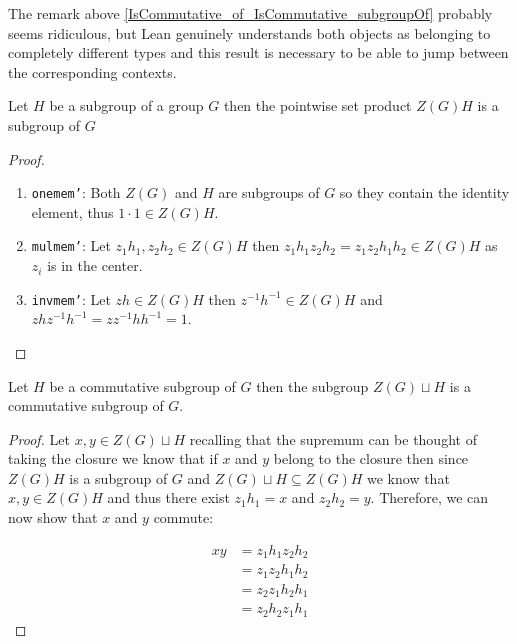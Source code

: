 \begin{remark}
  The remark above \ref{IsCommutative_of_IsCommutative_subgroupOf} probably seems ridiculous, but Lean genuinely understands both objects as belonging to completely different types and 
  this result is necessary to be able to jump between the corresponding contexts.
\end{remark}

\begin{definition}
  \label{center_mul}
  \leanok
  Let $H$ be a subgroup of a group $G$ then the pointwise set product $Z(G) H$ is a subgroup of $G$
\end{definition}
\begin{proof}
\begin{enumerate}
  \item \texttt{one\textunderscore mem'}: Both $Z(G)$ and $H$ are subgroups of $G$ so they contain the identity element, thus $1 \cdot 1 \in Z(G) H$.
  \item \texttt{mul\textunderscore mem'}: Let $z_1 h_1, z_2 h_2 \in Z(G) H$ then $z_1h_1z_2h_2 = z_1z_2 h_1h_2 \in Z(G) H$ as $z_i$ is in the center.
  \item \texttt{inv\textunderscore mem'}: Let $zh \in Z(G) H$ then $z^{-1} h^{-1} \in Z(G) H$ and $z h z^{-1} h^{-1} = zz^{-1}h h^{-1} = 1$.
\end{enumerate}
\end{proof}


\begin{lemma}
  \label{center_mul_subset_center_mul}
  \leanok
\end{lemma}

\begin{lemma}
  \label{IsComm_of_center_join_IsComm}
  \leanok

  Let $H$ be a commutative subgroup of $G$ then the subgroup $Z(G) \sqcup H$  is a commutative subgroup of $G$.
\end{lemma}
\begin{proof}
  Let $x, y \in Z(G) \sqcup H$ recalling that the supremum can be thought of taking the closure
  we know that if $x$ and $y$ belong to the closure then since $Z(G) H$ is a subgroup of $G$ and $Z(G) \sqcup H \subseteq Z(G) H$
  we know that $x, y \in Z(G) H$ and thus there exist $z_1 h_1 = x$ and $z_2 h_2 = y$. Therefore, we can now show that $x$ and $y$ commute:

  \begin{align*}
  x y &= z_1 h_1 z_2 h_2\\
  & = z_1 z_2 h_1 h_2 \tag{as $z_2$ is in the center}\\
  &= z_2 z_1 h_2 h_1 \tag{as $H$ is a commutative subgroup}\\
  &= z_2 h_2 z_1 h_1 \tag{as $z_1$ is in the center}
  \end{align*}
\end{proof}

